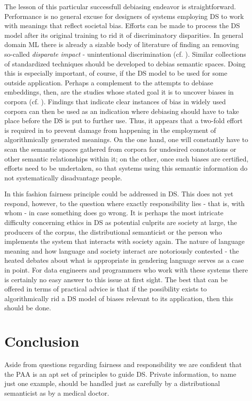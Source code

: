 \documentclass{article}
\begin{document}
The lesson of this particular successfull debiasing endeavor is straightforward. Performance is no general excuse for designers of systems employing DS to work with meanings that reflect societal bias. Efforts can be made to process the DS model after its original training to rid it of discriminatory disparities. In general domain ML there is already a sizable body of literature of finding an removing so-called \emph{disparate impact} - unintentional discrimination (cf. \cite{feldman2015certifying} \cite{dwork2012fairness}). 
Similar collections of standardized techniques should be developed to debias semantic spaces. Doing this is especially important, of course, if the DS model to be used for some outside application. 
Perhaps a complement to the attempts to debiase embeddings, then, are the studies whose stated goal it is to uncover biases in corpora (cf. \cite{wagner2015s} \cite{herbelot2012distributional}). Findings that indicate clear instances of bias in widely used corpora can then be used as an indication where  debiasing should have to take place before the DS is put to further use.
Thus, it appears that a two-fold effort is required in to prevent damage from happening in the employment of algorithmically generated meanings. On the one hand, one will constantly have to scan the semantic spaces gathered from corpora for undesired connotations or other semantic relationships within it; on the other, once such biases are certified, efforts need to be undertaken, so that systems using this semantic information do not systematically disadvantage people.

In this fashion fairness principle could be addressed in DS. This does not yet respond, however, to the question where exactly responsibility lies - that is, with whom - in case something does go wrong.
It is perhaps the most intricate difficulty concerning ethics in DS as potential culprits are society at large, the producers of the corpus, the distributional semanticist or the person who implements the system that interacts with society again. 
The nature of language meaning and how language and society interact are notoriously contested - the heated debates about what is appropriate in gendering language serves as a case in point. For data engineers and programmers who work with these systems there is certainly no easy answer to this issue at first sight.
The best that can be offered in terms of practical advice is that if the possibility exists to algorithmically rid a DS model of biases relevant to its application, then this should be done.
\section{Conclusion}\hypertarget{sec5}{}
Aside from questions regarding fairness and responsibility we are confident that the PAA is an apt set of principles to guide DS. Private information, to name just one example, should be handled just as carefully by a distributional semanticist as by a medical doctor.
\end{document}
